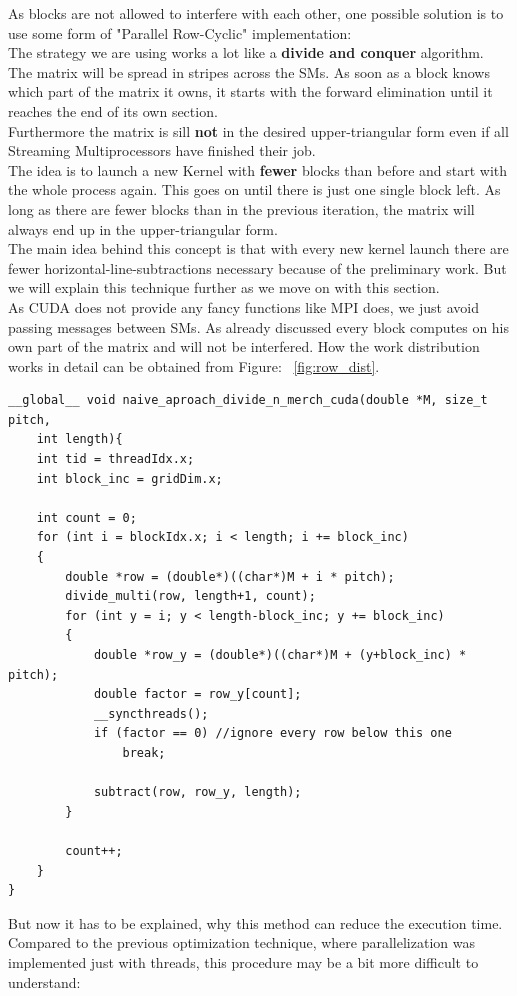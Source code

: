 \documentclass[draft, final]{vutinfth} %
\begin{document}
			As blocks are not allowed to interfere with each other, one possible solution is to use some form of "Parallel Row-Cyclic" implementation:\\
			The strategy we are using works a lot like a \textbf{divide and conquer} algorithm. The matrix will be spread in stripes across the SMs. As soon as a block knows which part of the matrix it owns, it starts with the forward elimination until it reaches the end of its own section.\\
			Furthermore the matrix is sill \textbf{not} in the desired upper-triangular form even if all Streaming Multiprocessors have finished their job.\\
			The idea is to launch a new Kernel with \textbf{fewer} blocks than before and start with the whole process again. This goes on until there is just one single block left. As long as there are fewer blocks than in the previous iteration, the matrix will always end up in the upper-triangular form.\\
			The main idea behind this concept is that with every new kernel launch there are fewer horizontal-line-subtractions necessary because of the preliminary work. But we will explain this technique further as we move on with this section.\\

			As CUDA does not provide any fancy functions like MPI does, we just avoid passing messages between SMs. As already discussed every block computes on his own part of the matrix and will not be interfered. How the work distribution works in detail can be obtained from Figure: ~\ref{fig:row_dist}.

			\begin{lstlisting}
__global__ void naive_aproach_divide_n_merch_cuda(double *M, size_t pitch,
	int length){
	int tid = threadIdx.x;
	int block_inc = gridDim.x;

	int count = 0;
	for (int i = blockIdx.x; i < length; i += block_inc)
	{
		double *row = (double*)((char*)M + i * pitch);
		divide_multi(row, length+1, count);
		for (int y = i; y < length-block_inc; y += block_inc)
		{
			double *row_y = (double*)((char*)M + (y+block_inc) * pitch);
			double factor = row_y[count];
		    __syncthreads();
			if (factor == 0) //ignore every row below this one
				break;

		    subtract(row, row_y, length);
		}
		
		count++;
	}
}
			\end{lstlisting}

			But now it has to be explained, why this method can reduce the execution time. Compared to the previous optimization technique, where parallelization was implemented just with threads, this procedure may be a bit more difficult to understand:
\end{document}
